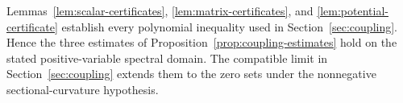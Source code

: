 Lemmas~\ref{lem:scalar-certificates}, \ref{lem:matrix-certificates},
and \ref{lem:potential-certificate} establish every polynomial
inequality used in Section~\ref{sec:coupling}. Hence the three estimates
of Proposition~\ref{prop:coupling-estimates} hold on the stated
positive-variable spectral domain. The compatible limit in
Section~\ref{sec:coupling} extends them to the zero sets under the
nonnegative sectional-curvature hypothesis.
